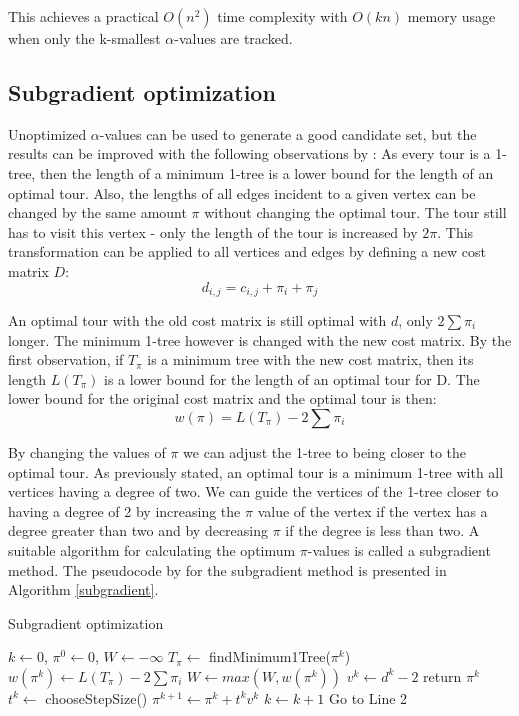 \documentclass[english, 12pt, a4paper, sci, utf8, a-1b, online]{aaltothesis}
\begin{document}
This achieves a practical $O(n^2)$ time complexity with $O(kn)$ memory usage when only the k-smallest $\alpha$-values are tracked.

\subsection{Subgradient optimization}

Unoptimized $\alpha$-values can be used to generate a good candidate set, but the results can be improved with the following observations by \cite{BF01584070}: As every tour is a 1-tree, then the length of a minimum 1-tree is a lower bound for the length of an optimal tour. Also, the lengths of all edges incident to a given vertex can be changed by the same amount $\pi$ without changing the optimal tour. The tour still has to visit this vertex - only the length of the tour is increased by $2 \pi$. This transformation can be applied to all vertices and edges by defining a new cost matrix $D$:
	\begin{equation*}
		d_{i, j} = c_{i, j} + \pi_i + \pi_j
	\end{equation*}

An optimal tour with the old cost matrix is still optimal with $d$, only $2 \sum \pi_i$ longer. The minimum 1-tree however is changed with the new cost matrix. By the first observation, if $T_{\pi}$ is a minimum tree with the new cost matrix, then its length $L(T_{\pi})$ is a lower bound for the length of an optimal tour for D. The lower bound for the original cost matrix and the optimal tour is then: 
	\begin{equation*}
		w(\pi) = L(T_{\pi}) - 2 \sum \pi_i
	\end{equation*}

By changing the values of $\pi$ we can adjust the 1-tree to being closer to the optimal tour. As previously stated, an optimal tour is a minimum 1-tree with all vertices having a degree of two. We can guide the vertices of the 1-tree closer to having a degree of 2 by increasing the $\pi$ value of the vertex if the vertex has a degree greater than two and by decreasing $\pi$ if the degree is less than two. A suitable algorithm for calculating the optimum $\pi$-values is called a subgradient method. The pseudocode by \cite{HELSGAUN2000106} for the subgradient method is presented in Algorithm \ref{subgradient}.

\begin{algorithm}[H]
	\caption{Subgradient optimization} 
	\begin{algorithmic}[1]
	    \State $k \leftarrow 0$, $\pi^0 \leftarrow 0$, $W \leftarrow -\infty$
	    \State $T_{\pi} \leftarrow$ findMinimum1Tree($\pi^k$)
	    \State $w(\pi^k) \leftarrow L(T_{\pi}) - 2 \sum \pi_i$
	    \State $W \leftarrow max(W, w(\pi^k))$
	    \State $v^k \leftarrow d^k - 2$
	    		\State return $\pi^k$
	    \EndIf
	    \State $t^k \leftarrow$ chooseStepSize()
	    \State $\pi^{k+1} \leftarrow \pi^k + t^k v^k$
	    \State $k \leftarrow k+1$
	    \State Go to Line 2
	\end{algorithmic} 
	\label{subgradient}
\end{algorithm}
\end{document}
